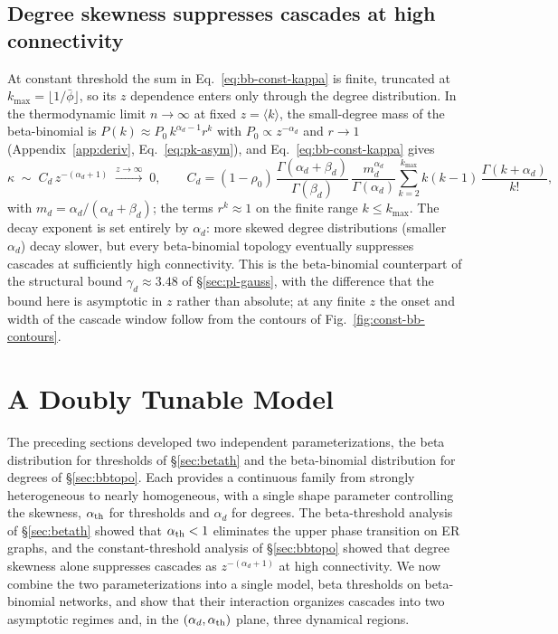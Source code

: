 \documentclass[]{revtex4-2}
\begin{document}
\subsection{Degree skewness suppresses cascades at high connectivity}

At constant threshold the sum in Eq.~\eqref{eq:bb-const-kappa} is finite, truncated at $k_{\max}=\lfloor 1/\bar\phi\rfloor$, so its $z$ dependence enters only through the degree distribution. In the thermodynamic limit $n\to\infty$ at fixed $z=\langle k\rangle$, the small-degree mass of the beta-binomial is $P(k)\approx P_0\,k^{\alpha_d-1}r^k$ with $P_0\propto z^{-\alpha_d}$ and $r\to 1$ (Appendix~\ref{app:deriv}, Eq.~\eqref{eq:pk-asym}), and Eq.~\eqref{eq:bb-const-kappa} gives
\begin{equation}
    \kappa \;\sim\; C_d\, z^{-(\alpha_d+1)} \;\xrightarrow{z\to\infty}\; 0,
    \qquad
    C_d = (1-\rho_0)\,\frac{\Gamma(\alpha_d+\beta_d)}{\Gamma(\beta_d)}
    \,\frac{m_d^{\alpha_d}}{\Gamma(\alpha_d)}
    \sum_{k=2}^{k_{\max}} k(k-1)\,\frac{\Gamma(k+\alpha_d)}{k!},
    \label{eq:const-kappa-asym}
\end{equation}
with $m_d=\alpha_d/(\alpha_d+\beta_d)$; the terms $r^k\approx 1$ on the finite range $k\le k_{\max}$. The decay exponent is set entirely by $\alpha_d$: more skewed degree distributions (smaller $\alpha_d$) decay slower, but every beta-binomial topology eventually suppresses cascades at sufficiently high connectivity. This is the beta-binomial counterpart of the structural bound $\gamma_d\approx3.48$ of \S\ref{sec:pl-gauss}, with the difference that the bound here is asymptotic in $z$ rather than absolute; at any finite $z$ the onset and width of the cascade window follow from the contours of Fig.~\ref{fig:const-bb-contours}.

\section{A Doubly Tunable Model}
\label{sec:phase}

The preceding sections developed two independent parameterizations, the beta distribution for thresholds of \S\ref{sec:betath} and the beta-binomial distribution for degrees of \S\ref{sec:bbtopo}. Each provides a continuous family from strongly heterogeneous to nearly homogeneous, with a single shape parameter controlling the skewness, $\alpha_{\rm th}$ for thresholds and $\alpha_d$ for degrees. The beta-threshold analysis of \S\ref{sec:betath} showed that $\alpha_{\rm th}<1$ eliminates the upper phase transition on ER graphs, and the constant-threshold analysis of \S\ref{sec:bbtopo} showed that degree skewness alone suppresses cascades as $z^{-(\alpha_d+1)}$ at high connectivity. We now combine the two parameterizations into a single model, beta thresholds on beta-binomial networks, and show that their interaction organizes cascades into two asymptotic regimes and, in the $(\alpha_d,\alpha_{\rm th})$ plane, three dynamical regions.
\end{document}
